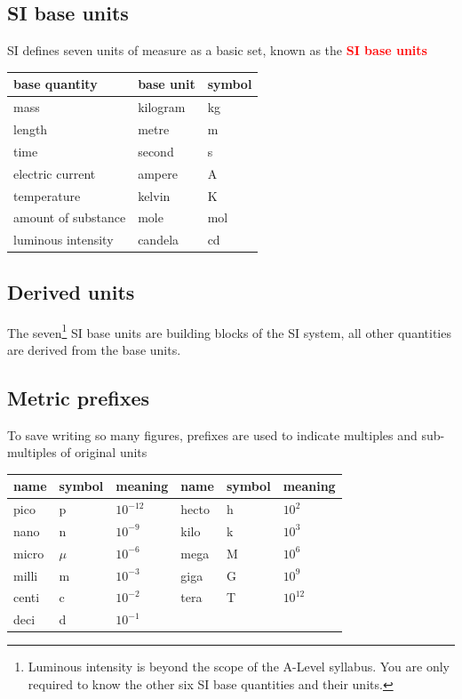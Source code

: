 \documentclass[a4paper,12pt]{book}
\newcommand{\keypoint}[1]{\textbf{\textcolor{red}{#1}}}
\newcommand{\keypoint}[1]{\textbf{\textcolor{red}{#1}}}
\begin{document}
\subsection{SI base units}

SI defines seven units of measure as a basic set, known as the \keypoint{SI base units}

\begin{center}
	\begin{tabular}{|C{5.4cm}|C{3cm}|C{3cm}|}
		\hline base quantity & base unit & symbol  \\ 
		\hline mass  & kilogram & kg \\ 
		\hline length & metre & m \\ 
		\hline time & second & s \\ 
		\hline electric current  & ampere & A \\ 
		\hline temperature & kelvin & K \\ 
		\hline amount of substance & mole & mol \\ 
		\hline luminous intensity & candela & cd \\ 
		\hline 
	\end{tabular} 
\end{center}

\subsection{Derived units}

The seven\footnote{Luminous intensity is beyond the scope of the A-Level syllabus. You are only required to know the other six SI base quantities and their units.} SI base units are building blocks of the SI system, all other quantities are derived from the base units.

\newpage

 
 
 

\subsection{Metric prefixes}

To save writing so many figures, prefixes are used to indicate multiples and sub-multiples of original units

\begin{center}
	\begin{tabular}{|C{1.5cm}|C{1.5cm}|C{1.5cm}||C{1.5cm}|C{1.5cm}|C{1.5cm}|}
		\hline name & symbol & meaning & name & symbol & meaning \\ 
		\hline pico & p & $10^{-12}$ & hecto & h & $10^{2}$\\ 
		\hline nano & n & $10^{-9}$ & kilo & k & $10^{3}$\\ 
		\hline micro & $\mu$ & $10^{-6}$ & mega & M & $10^{6}$\\ 
		\hline milli & m & $10^{-3}$ & giga & G & $10^{9}$\\ 
		\hline centi & c & $10^{-2}$ & tera & T & $10^{12}$\\ 
		\hline deci & d & $10^{-1}$ & & &\\ 
		\hline 
	\end{tabular} 
\end{center}
\end{document}
